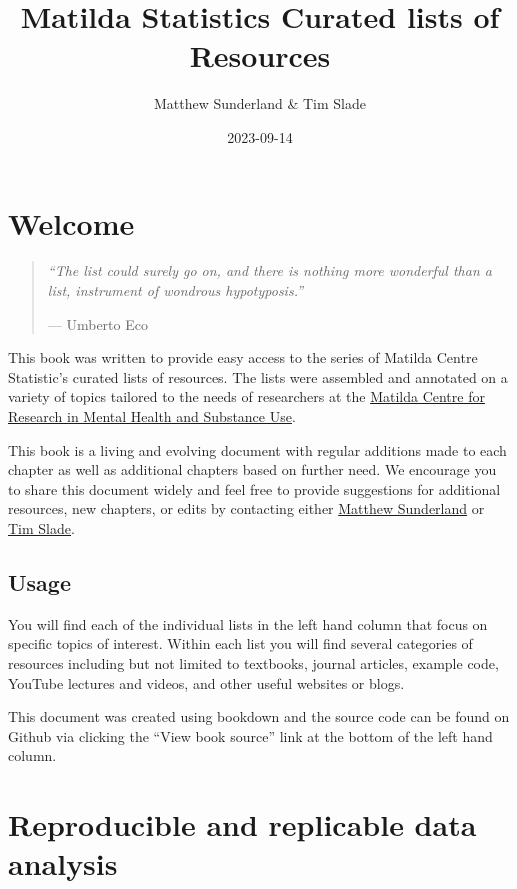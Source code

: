 \documentclass[
]{book}
\title{Matilda Statistics Curated lists of Resources}
\author{Matthew Sunderland \& Tim Slade}
\date{2023-09-14}
\begin{document}
\maketitle

{
\setcounter{tocdepth}{1}
\tableofcontents
}
\hypertarget{welcome}{%
\chapter{Welcome}\label{welcome}}

\begin{quote}
\emph{``The list could surely go on, and there is nothing more wonderful than a list, instrument of wondrous hypotyposis.''}

--- Umberto Eco
\end{quote}

This book was written to provide easy access to the series of Matilda Centre Statistic's curated lists of resources. The lists were assembled and annotated on a variety of topics tailored to the needs of researchers at the \href{https://www.sydney.edu.au/matilda-centre/}{Matilda Centre for Research in Mental Health and Substance Use}.

This book is a living and evolving document with regular additions made to each chapter as well as additional chapters based on further need. We encourage you to share this document widely and feel free to provide suggestions for additional resources, new chapters, or edits by contacting either \href{mailto:\%20matthew.sunderland@sydney.edu.au}{Matthew Sunderland} or \href{mailto:\%20tim.slade@sydney.edu.au}{Tim Slade}.

\hypertarget{usage}{%
\section{Usage}\label{usage}}

You will find each of the individual lists in the left hand column that focus on specific topics of interest. Within each list you will find several categories of resources including but not limited to textbooks, journal articles, example code, YouTube lectures and videos, and other useful websites or blogs.

This document was created using bookdown and the source code can be found on Github via clicking the ``View book source'' link at the bottom of the left hand column.

\hypertarget{reproducible-and-replicable-data-analysis}{%
\chapter{Reproducible and replicable data analysis}\label{reproducible-and-replicable-data-analysis}}
\end{document}
